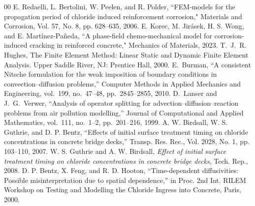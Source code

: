 \documentclass[conference]{IEEEtran}
\begin{document}
\begin{thebibliography}{00}
E. Redaelli, L. Bertolini, W. Peelen, and R. Polder, ``FEM-models for the propagation period of chloride induced reinforcement corrosion," Materials and Corrosion, Vol. 57, No. 8, pp. 628--635, 2006.
 E. Korec, M. Jir\'asek, H. S. Wong, and E. Mart\'inez-Pa\~neda, ``A phase-field chemo-mechanical model for corrosion-induced cracking in reinforced concrete," Mechanics of Materials, 2023.
 T.~J.~R. Hughes, The Finite Element Method: Linear Static and Dynamic Finite Element Analysis. Upper Saddle River, NJ: Prentice Hall, 2000.
 E.~Burman, ``A consistent Nitsche formulation for the weak imposition
of boundary conditions in convection--diffusion problems,'' Computer Methods in Applied Mechanics and Engineering, vol.~199, no.~47--48, pp.~2845--2855, 2010.
 D.~Lanser and J.~G.~Verwer, ``Analysis of operator splitting for advection--diffusion--reaction problems from air pollution modelling,'' Journal of Computational and Applied Mathematics, vol.~111, no.~1--2, pp.~201--216, 1999.
 A. W. Birdsall, W. S. Guthrie, and D. P. Bentz, ``Effects of initial surface treatment timing on chloride concentrations in concrete bridge decks,'' Transp. Res. Rec., Vol. 2028, No. 1, pp. 103--110, 2007.
 W. S. Guthrie and A. W. Birdsall, \textit{Effect of initial surface treatment timing on chloride concentrations in concrete bridge decks}, Tech. Rep., 2008.
 D. P. Bentz, X. Feng, and R. D. Hooton, ``Time-dependent diffusivities: Possible misinterpretation due to spatial dependence,'' in Proc. 2nd Int. RILEM Workshop on Testing and Modelling the Chloride Ingress into Concrete, Paris, 2000.

\end{thebibliography}
\end{document}
